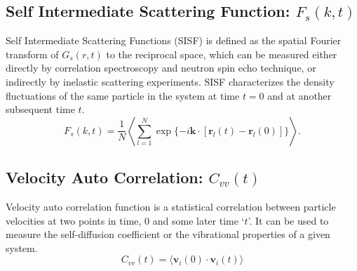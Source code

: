 \documentclass{article}
\begin{document}
\subsection{Self Intermediate Scattering Function: $F_s(k,t)$} \label{sec::Fsqt}
Self Intermediate Scattering Functions (SISF) is defined as the spatial Fourier transform of $G_s(r,t)$ to the reciprocal space, which can be measured either directly by correlation spectroscopy and neutron spin echo technique, or indirectly by inelastic scattering experiments. SISF characterizes the density fluctuations of the same particle in the system at time $t = 0$ and at another subsequent time $t$.
\begin{equation}
\label{eq:fsqt}
F_s(k,t) = \frac{1}{N} \left\langle \sum_{l=1}^{N} \exp{\{-i\mathbf{k}\cdot[\mathbf{r}_l(t) - \mathbf{r}_l(0)]}\}\right\rangle.
\end{equation} 

\subsection{Velocity Auto Correlation: $C_{vv}(t)$} \label{sec::VACF}
Velocity auto correlation function is a statistical correlation between particle velocities at two points in time, 0 and some later time `$t$'. It can be used to measure the self-diffusion coefficient or the vibrational properties of a given system.
\begin{equation}
\label{eq:vacf}
 C_{vv}(t) = \langle \textbf{v}_i(0)\cdot \textbf{v}_i(t)\rangle
\end{equation} 
\end{document}
